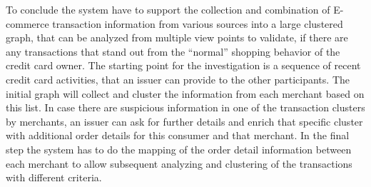To conclude the system have to support the collection and combination of \gls{E-commerce} transaction information from various sources into a large clustered graph, that can be analyzed from multiple view points to validate, if there are any transactions that stand out from the ``normal'' shopping behavior of the credit card owner. The starting point for the investigation is a sequence of recent credit card activities, that an issuer can provide to the other participants. The initial graph will collect and cluster the information from each merchant based on this list. In case there are suspicious information in one of the transaction clusters by merchants, an issuer can ask for further details and enrich that specific cluster with additional order details for this consumer and that merchant. In the final step the system has to do the mapping of the order detail information between each merchant to allow subsequent analyzing and clustering of the transactions with different criteria.

